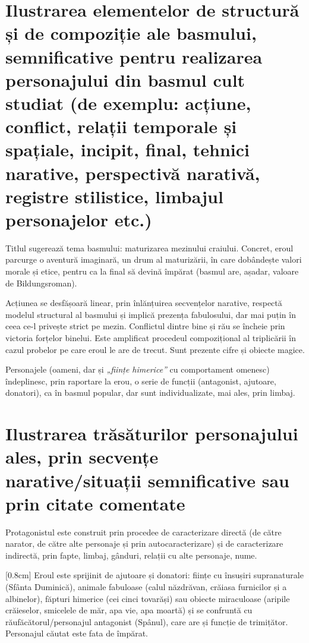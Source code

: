 \section{Ilustrarea elementelor de structură și de compoziție ale basmului, semnificative pentru realizarea personajului din basmul cult studiat {\footnotesize\normalfont (de exemplu: acțiune, conflict, relații temporale și spațiale, incipit, final, tehnici narative, perspectivă narativă, registre stilistice, limbajul personajelor etc.)}}

Titlul sugerează tema basmului: maturizarea mezinului craiului. Concret, eroul parcurge o aventură imaginară, un drum al maturizării, în care dobândește valori morale și etice, pentru ca la final să devină împărat (basmul are, așadar, valoare de Bildungsroman).

Acțiunea se desfășoară linear, prin înlănțuirea secvențelor narative, respectă modelul structural al basmului și implică prezența fabulosului, dar mai puțin în ceea ce-l privește strict pe mezin. Conflictul dintre bine și rău se încheie prin victoria forțelor binelui. Este amplificat procedeul compozițional al triplicării în cazul probelor pe care eroul le are de trecut. Sunt prezente cifre și obiecte magice.

Personajele (oameni, dar și \textit{„ființe himerice”} cu comportament omenesc) îndeplinesc, prin raportare la erou, o serie de funcții (antagonist, ajutoare, donatori), ca în basmul popular, dar sunt individualizate, mai ales, prin limbaj.


\section{Ilustrarea trăsăturilor personajului ales, prin secvențe \\ narative/situații semnificative sau prin citate comentate}

Protagonistul este construit prin procedee de caracterizare directă (de către narator, de către alte personaje și prin autocaracterizare) și de caracterizare indirectă, prin fapte, limbaj, gânduri, relații cu alte personaje, nume.

[0.8cm]
Eroul este sprijinit de ajutoare și donatori: ființe cu însușiri supranaturale (Sfânta Duminică), animale fabuloase (calul năzdrăvan, crăiasa furnicilor și a albinelor), făpturi himerice (cei cinci tovarăși) sau obiecte miraculoase (aripile crăieselor, smicelele de măr, apa vie, apa moartă) și se confruntă cu răufăcătorul/personajul antagonist (Spânul), care are și funcție de trimițător. Personajul căutat este fata de împărat.

